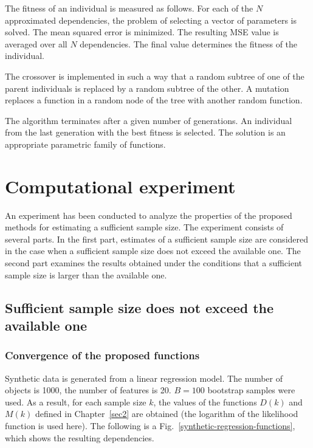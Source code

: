 \documentclass[
11pt,%
tightenlines,%
twoside,%
onecolumn,%
nofloats,%
nobibnotes,%
nofootinbib,%
superscriptaddress,%
noshowpacs,%
centertags]%
{revtex4-2}
\begin{document}
The fitness of an individual is measured as follows. For each of the $N$ approximated dependencies, the problem of selecting a vector of parameters is solved. The mean squared error is minimized. The resulting MSE value is averaged over all $N$ dependencies. The final value determines the fitness of the individual.

The crossover is implemented in such a way that a random subtree of one of the parent individuals is replaced by a random subtree of the other. A mutation replaces a function in a random node of the tree with another random function. 

The algorithm terminates after a given number of generations. An individual from the last generation with the best fitness is selected. The solution is an appropriate parametric family of functions.

\section{Computational experiment}\label{sec4}

An experiment has been conducted to analyze the properties of the proposed methods for estimating a sufficient sample size. The experiment consists of several parts. In the first part, estimates of a sufficient sample size are considered in the case when a sufficient sample size does not exceed the available one. The second part examines the results obtained under the conditions that a sufficient sample size is larger than the available one.

\subsection{Sufficient sample size does not exceed the available one}

\subsubsection{Convergence of the proposed functions}

Synthetic data is generated from a linear regression model. The number of objects is 1000, the number of features is 20. $B=100$ bootstrap samples were used. As a result, for each sample size $k$, the values of the functions $D(k)$ and $M(k)$ defined in Chapter~\ref{sec2} are obtained (the logarithm of the likelihood function is used here). The following is a Fig.~\ref{synthetic-regression-functions}, which shows the resulting dependencies.
\end{document}
